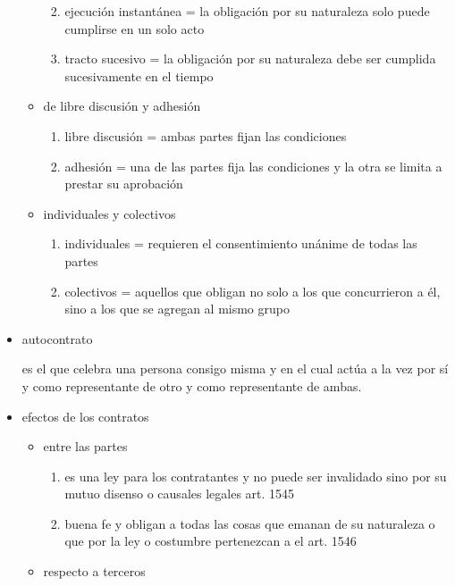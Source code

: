 \documentclass[]{article}
\providecommand{\tightlist}{%
  \setlength{\itemsep}{0pt}\setlength{\parskip}{0pt}}
\begin{document}
\begin{itemize}
\begin{itemize}
    \begin{enumerate}
    \def\labelenumi{\arabic{enumi}.}
    \tightlist
    \item
      ejecución instantánea = la obligación por su naturaleza solo puede
      cumplirse en un solo acto
    \item
      tracto sucesivo = la obligación por su naturaleza debe ser
      cumplida sucesivamente en el tiempo
    \end{enumerate}
  \item
    de libre discusión y adhesión

    \begin{enumerate}
    \def\labelenumi{\arabic{enumi}.}
    \tightlist
    \item
      libre discusión = ambas partes fijan las condiciones
    \item
      adhesión = una de las partes fija las condiciones y la otra se
      limita a prestar su aprobación
    \end{enumerate}
  \item
    individuales y colectivos

    \begin{enumerate}
    \def\labelenumi{\arabic{enumi}.}
    \tightlist
    \item
      individuales = requieren el consentimiento unánime de todas las
      partes
    \item
      colectivos = aquellos que obligan no solo a los que concurrieron a
      él, sino a los que se agregan al mismo grupo
    \end{enumerate}
  \end{itemize}
\item
  autocontrato

  es el que celebra una persona consigo misma y en el cual actúa a la
  vez por sí y como representante de otro y como representante de ambas.
\item
  efectos de los contratos

  \begin{itemize}
  \item
    entre las partes

    \begin{enumerate}
    \def\labelenumi{\arabic{enumi}.}
    \tightlist
    \item
      es una ley para los contratantes y no puede ser invalidado sino
      por su mutuo disenso o causales legales art. 1545
    \item
      buena fe y obligan a todas las cosas que emanan de su naturaleza o
      que por la ley o costumbre pertenezcan a el art. 1546
    \end{enumerate}
  \item
    respecto a terceros


\end{itemize}
\end{itemize}
\end{document}
